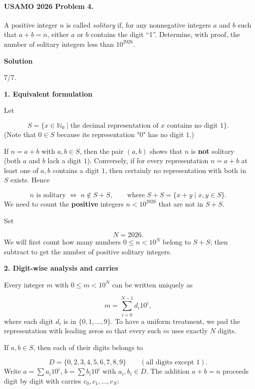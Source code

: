\documentclass{llmxive}
\providecommand{\solutionheading}[1]{\par\smallskip\noindent\textbf{#1}\par}
\begin{document}
\paragraph{USAMO 2026 Problem 4.}
\begin{mdframed}[style=mdpurplebox,frametitle={USAMO 2026 Problem 4}]
A positive integer $n$ is called \emph{solitary} if, for any nonnegative integers $a$ and $b$ such that $a + b = n$, either $a$ or $b$ contains the digit ``1''. Determine, with proof, the number of solitary integers less than $10^{2026}$.
\end{mdframed}
\solutionheading{Solution}
\begin{remark*}
  7/7.
\end{remark*}
\solutionheading{1. Equivalent formulation}
Let\par
\[
S = \{ x \in \mathbb{N}_0 \mid \text{the decimal representation of } x \text{ contains no digit } 1\}.
\]
(Note that \(0\in S\) because its representation "0" has no digit \(1\).)\par
If \(n = a+b\) with \(a,b\in S\), then the pair \((a,b)\) shows that \(n\) is \textbf{not} solitary (both \(a\) and \(b\) lack a digit \(1\)). Conversely, if for every representation \(n = a+b\) at least one of \(a,b\) contains a digit \(1\), then certainly no representation with both in \(S\) exists. Hence\par
\[
n \text{ is solitary } \Longleftrightarrow \; n \notin S+S,
\qquad\text{where } S+S = \{ x+y \mid x,y\in S\}.
\]
We need to count the \textbf{positive} integers \(n < 10^{2026}\) that are not in \(S+S\).\par
Set\par
\[
N = 2026.
\]
We will first count how many numbers \(0 \le n < 10^N\) belong to \(S+S\); then subtract to get the number of positive solitary integers.\par
\solutionheading{2. Digit-wise analysis and carries}
Every integer \(m\) with \(0 \le m < 10^N\) can be written uniquely as\par
\[
m = \sum_{i=0}^{N-1} d_i 10^i,
\]
where each digit \(d_i\) is in \(\{0,1,\dots,9\}\). To have a uniform treatment, we pad the representation with leading zeros so that every such \(m\) uses exactly \(N\) digits.\par
If \(a,b\in S\), then each of their digits belongs to\par
\[
D = \{0,2,3,4,5,6,7,8,9\}\qquad(\text{all digits except }1).
\]
Write \(a = \sum a_i 10^i\), \(b = \sum b_i 10^i\) with \(a_i,b_i\in D\). The addition \(a+b = n\) proceeds digit by digit with carries \(c_0,c_1,\dots,c_N\):\par
\end{document}
